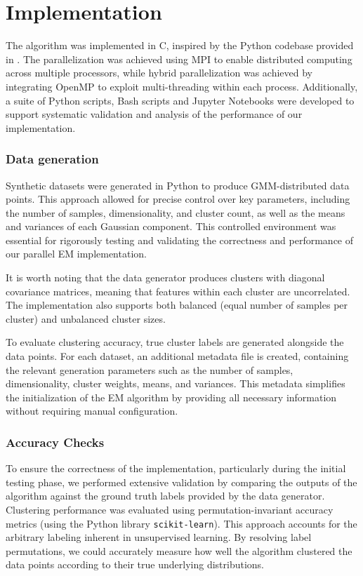 \section{Implementation}

The algorithm was implemented in C, inspired by the Python codebase provided in \cite{Azizi2023ParallelEM}.
The parallelization was achieved using MPI to enable distributed computing across multiple processors, while hybrid parallelization was achieved by integrating OpenMP to exploit multi-threading within each process.
Additionally, a suite of Python scripts, Bash scripts and Jupyter Notebooks were developed to support systematic validation and analysis of the performance of our implementation.

\subsubsection*{Data generation}
Synthetic datasets were generated in Python to produce GMM-distributed data points.
This approach allowed for precise control over key parameters, including the number of samples, dimensionality, and cluster count, as well as the means and variances of each Gaussian component.
This controlled environment was essential for rigorously testing and validating the correctness and performance of our parallel EM implementation.

It is worth noting that the data generator produces clusters with diagonal covariance matrices, meaning that features within each cluster are uncorrelated.
The implementation also supports both balanced (equal number of samples per cluster) and unbalanced cluster sizes.

To evaluate clustering accuracy, true cluster labels are generated alongside the data points.
For each dataset, an additional metadata file is created, containing the relevant generation parameters such as the number of samples, dimensionality, cluster weights, means, and variances.
This metadata simplifies the initialization of the EM algorithm by providing all necessary information without requiring manual configuration.

\subsubsection*{Accuracy Checks}
To ensure the correctness of the implementation, particularly during the initial testing phase, we performed extensive validation
by comparing the outputs of the algorithm against the ground truth labels provided by the data generator.
Clustering performance was evaluated using permutation-invariant accuracy metrics (using the Python library \texttt{scikit-learn}).
This approach accounts for the arbitrary labeling inherent in unsupervised learning.
By resolving label permutations, we could accurately measure how well the algorithm clustered the data points according to their true underlying distributions.

